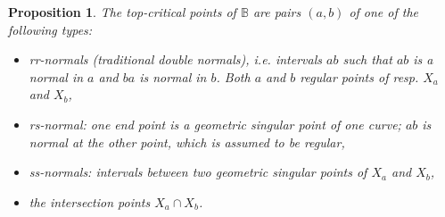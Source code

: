 \documentclass[12pt,a4,twoside]{amsart}
\newtheorem{prop}{Proposition}
\newtheorem*{main lemma}{The main lemma}
\begin{document}
\begin{prop}\label{p:double-crit}
The top-critical points of $ \mathbb{B}$ are pairs $(a,b)$ of one of the following types:
\begin{itemize}
\item rr-normals (traditional double normals),  i.e. intervals $ab$ such that $ab$ is a normal in $a$ and $ba$ is  normal in $b$. Both $a$ and $b$ regular points of resp. $X_a$ and $X_b$,
\item rs-normal:   one end point is a geometric singular point of one curve;
 $ab$ is normal at the other point, which is assumed to be  regular,
 \item ss-normals: intervals between two geometric singular points of $X_a$ and $X_b$,
 \item the intersection points $X_a \cap X_b$.
\end{itemize}
\end{prop}
\end{document}
